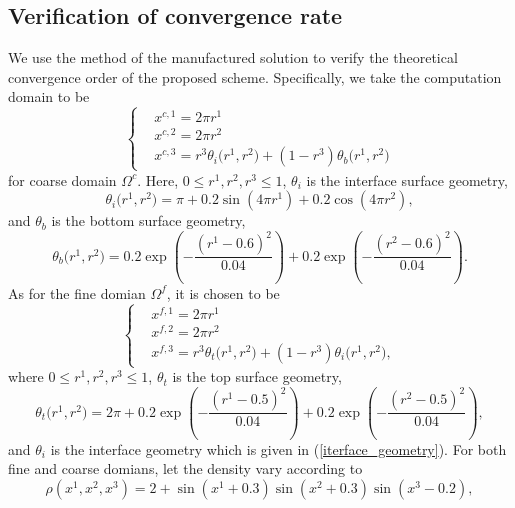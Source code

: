 \subsection{Verification of convergence rate}\label{convergence_study}
We use the method of the manufactured solution to verify the theoretical convergence order of the proposed scheme. Specifically, we take the computation domain to be 
\begin{equation}\label{coarse_domain_manufactured}
\left\{
\begin{aligned}
& x^{c,1} = 2\pi r^1\\
& x^{c,2} = 2\pi r^2\\
& x^{c,3} = r^3\theta_i\big(r^1,r^2\big) + (1-r^3)\theta_b\big(r^1,r^2\big)
\end{aligned}
\right.
\end{equation}
for coarse domain $\Omega^c$. Here, $0\leq r^1, r^2, r^3\leq 1$, $\theta_i$ is the interface surface geometry,
\begin{equation}\label{iterface_geometry}
\theta_i\big(r^1,r^2\big) = \pi+0.2\sin(4\pi r^1)+0.2\cos(4\pi r^2),
\end{equation}
and 
$\theta_b$ is the bottom surface geometry,
\begin{equation}\label{bottom_geometry}
\theta_b\big(r^1,r^2\big) = 0.2\exp\left(-\frac{(r^1-0.6)^2}{0.04}\right)+0.2\exp\left(-\frac{(r^2-0.6)^2}{0.04}\right).
\end{equation}
As for the fine domian $\Omega^f$, it is chosen to be
\begin{equation}\label{fine_domain_manufactured}
\left\{
\begin{aligned}
& x^{f,1} = 2\pi r^1\\
& x^{f,2} = 2\pi r^2\\
& x^{f,3} = r^3\theta_t\big(r^1,r^2\big) + (1-r^3)\theta_i\big(r^1,r^2\big),
\end{aligned}
\right.
\end{equation}
where $0\leq r^1, r^2, r^3\leq 1$, $\theta_t$ is the top surface geometry,
\begin{equation}\label{top_geometry}
\theta_t\big(r^1,r^2\big) = 2\pi+0.2\exp\left(-\frac{(r^1-0.5)^2}{0.04}\right)+0.2\exp\left(-\frac{(r^2-0.5)^2}{0.04}\right),
\end{equation}
and $\theta_i$ is the interface geometry which is given in (\ref{iterface_geometry}). For both fine and coarse domians, let the density vary according to
\begin{equation}\label{density_function}
\rho(x^1,x^2,x^3) = 2 + \sin(x^1+0.3)\sin(x^2+0.3)\sin(x^3-0.2),
\end{equation}
